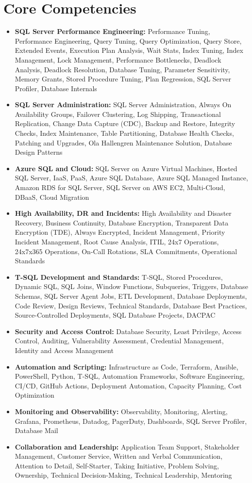 \documentclass[10pt,a4paper]{article}
\begin{document}
\section{Core Competencies}
\begin{itemize}
  \item \textbf{SQL Server Performance Engineering:} Performance Tuning, Performance Engineering, Query Tuning, Query Optimization, Query Store, Extended Events, Execution Plan Analysis, Wait Stats, Index Tuning, Index Management, Lock Management, Performance Bottlenecks, Deadlock Analysis, Deadlock Resolution, Database Tuning, Parameter Sensitivity, Memory Grants, Stored Procedure Tuning, Plan Regression, SQL Server Profiler, Database Internals
  \item \textbf{SQL Server Administration:} SQL Server Administration, Always On Availability Groups, Failover Clustering, Log Shipping, Transactional Replication, Change Data Capture (CDC), Backup and Restore, Integrity Checks, Index Maintenance, Table Partitioning, Database Health Checks, Patching and Upgrades, Ola Hallengren Maintenance Solution, Database Design Patterns
  \item \textbf{Azure SQL and Cloud:} SQL Server on Azure Virtual Machines, Hosted SQL Server, IaaS, PaaS, Azure SQL Database, Azure SQL Managed Instance, Amazon RDS for SQL Server, SQL Server on AWS EC2, Multi-Cloud, DBaaS, Cloud Migration
  \item \textbf{High Availability, DR and Incidents:} High Availability and Disaster Recovery, Business Continuity, Database Encryption, Transparent Data Encryption (TDE), Always Encrypted, Incident Management, Priority Incident Management, Root Cause Analysis, ITIL, 24x7 Operations, 24x7x365 Operations, On-Call Rotations, SLA Commitments, Operational Standards
  \item \textbf{T-SQL Development and Standards:} T-SQL, Stored Procedures, Dynamic SQL, SQL Joins, Window Functions, Subqueries, Triggers, Database Schemas, SQL Server Agent Jobs, ETL Development, Database Deployments, Code Review, Design Reviews, Technical Standards, Database Best Practices, Source-Controlled Deployments, SQL Database Projects, DACPAC
  \item \textbf{Security and Access Control:} Database Security, Least Privilege, Access Control, Auditing, Vulnerability Assessment, Credential Management, Identity and Access Management
  \item \textbf{Automation and Scripting:} Infrastructure as Code, Terraform, Ansible, PowerShell, Python, T-SQL, Automation Frameworks, Software Engineering, CI/CD, GitHub Actions, Deployment Automation, Capacity Planning, Cost Optimization
  \item \textbf{Monitoring and Observability:} Observability, Monitoring, Alerting, Grafana, Prometheus, Datadog, PagerDuty, Dashboards, SQL Server Profiler, Database Mail
  \item \textbf{Collaboration and Leadership:} Application Team Support, Stakeholder Management, Customer Service, Written and Verbal Communication, Attention to Detail, Self-Starter, Taking Initiative, Problem Solving, Ownership, Technical Decision-Making, Technical Leadership, Mentoring
\end{itemize}
\end{document}
